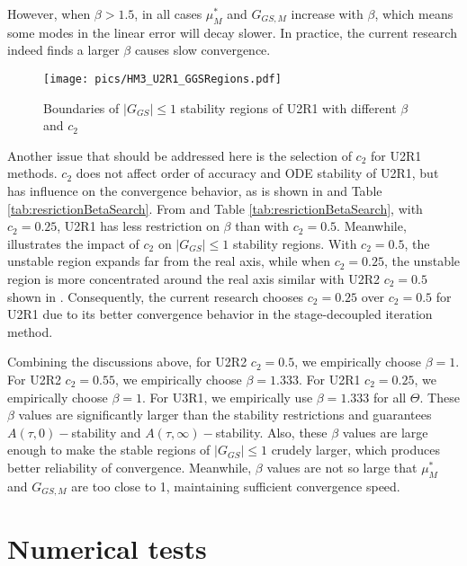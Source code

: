However, when $\beta>1.5$, in all cases $\mu^*_{M}$ and $G_{GS,M}$ increase
with $\beta$, which means some modes in the linear error will
decay slower. In practice, the current research indeed finds a larger
$\beta$ causes slow convergence.

\begin{figure}[htbp]
    \centering
    \texttt{[image: pics/HM3\_U2R1\_GGSRegions.pdf]}
    \caption[]{Boundaries of $|G_{GS}|\leq1$ stability regions of U2R1 with different $\beta$ and $c_2$}
    \label{fig:HM3_U2R1_GGSRegions}
\end{figure}
Another issue that should be addressed here is the
selection of $c_2$ for U2R1 methods. $c_2$ does not
affect order of accuracy and ODE stability of U2R1, but
has influence on the convergence behavior, as is shown
in  and Table \ref{tab:resrictionBetaSearch}.
From  and Table \ref{tab:resrictionBetaSearch},
with $c_2=0.25$, U2R1 has less restriction on $\beta$ than with $c_2=0.5$.
Meanwhile,  illustrates the
impact of $c_2$ on $|G_{GS}|\leq1$ stability regions.
With $c_2=0.5$, the unstable region expands far from the real axis,
while when $c_2=0.25$, the unstable region is
more concentrated around the real axis similar with U2R2 $c_2=0.5$
shown in .
Consequently, the current research chooses $c_2=0.25$ over $c_2=0.5$
for U2R1 due to its better convergence behavior in
the stage-decoupled iteration method.



Combining the discussions above,
for U2R2 $c_2=0.5$, we empirically choose $\beta = 1$.
For U2R2 $c_2=0.55$, we empirically choose $\beta = 1.333$.
For U2R1 $c_2=0.25$, we empirically choose $\beta = 1$.
For U3R1, we empirically use $\beta = 1.333$ for all $\Theta$.
These $\beta$ values are significantly larger than the
stability restrictions and guarantees
$A(\tau,0)-$stability and
$A(\tau,\infty)-$stability.
Also, these  $\beta$ values are large enough to make the stable regions of $|G_{GS}|\leq1$
crudely larger, which produces better reliability of convergence.
Meanwhile, $\beta$ values are not so large that $\mu^*_{M}$ and $G_{GS,M}$
are too close to 1, maintaining sufficient convergence speed.



\section{Numerical tests}
\label{sec:Results}

